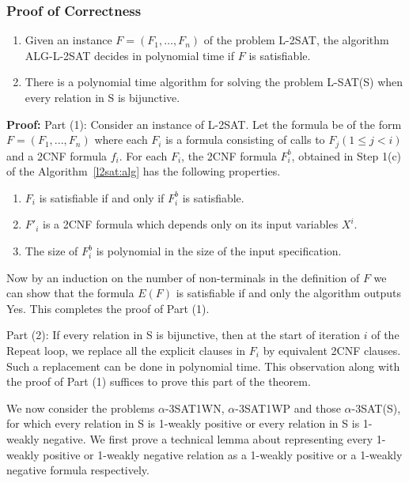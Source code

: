 \subsubsection*{Proof of Correctness}




\begin{theorem}\label{th:h2satseasy}
\begin{enumerate}
\item
Given an instance $F = (F_1, \ldots, F_n)$ of the problem L-2SAT, 
the algorithm ALG-L-2SAT decides 
in polynomial time if $F$ is satisfiable. 
\item
There is a polynomial time algorithm for solving the problem L-SAT(S)
when every relation in S is bijunctive.
\end{enumerate}
\end{theorem}

\noindent
{\bf Proof:}
Part (1): 
Consider an instance of {\sf L-2SAT}.
Let the formula be of the form $F = (F_1,...,F_n)$ where each
$F_i$ is a formula consisting of calls to $F_j (1 \leq j < i)$ and a
{\sf 2CNF} formula $f_i$. 
For each $F_i$, the  {\sf 2CNF} formula $F^b_i$, 
obtained in Step 1(c) of the Algorithm~\ref{l2sat:alg} 
has the following properties.
\begin{enumerate}
\item
$F_i$ is satisfiable if and only if  $F^b_i$ is satisfiable.

\item
$F'_i$ is a {\sf 2CNF} formula which depends only on its input variables
$X^i$.

\item
The size of $F^b_i$ is polynomial in the size of the input specification.
\end{enumerate}
Now by an induction on the number of non-terminals in the definition of 
$F$ we can show that the formula $E(F)$ is satisfiable if and only the 
algorithm outputs Yes. This completes the proof of Part (1).


\noindent
Part (2): If every relation in {\sf S} 
is bijunctive, then at the start of iteration $i$ of the Repeat loop, 
we replace all the explicit clauses in $F_i$ by equivalent {\sf 2CNF} clauses.
Such a replacement can be done in polynomial time.
This observation along with the proof of Part (1) suffices to prove this part
of the theorem.\QED


We now consider the problems $\alpha$-{\sf 3SAT1WN}, $\alpha$-{\sf 3SAT1WP} and
those $\alpha$-{\sf 3SAT(S)}, for which 
every relation in {\sf S} is 1-weakly positive or
every relation in {\sf S} is 1-weakly negative. We first prove a technical
lemma about representing every 1-weakly positive or 1-weakly negative relation
as a 1-weakly positive or a 1-weakly negative formula respectively.

